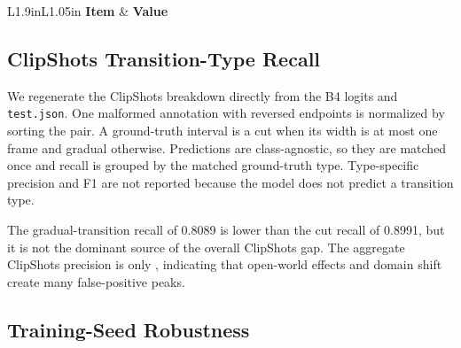 \begin{table}[!t]
\caption{Efficiency and Run-Artifact Statistics}
\label{tab:efficiency}
\centering
\small
\renewcommand{\arraystretch}{1.06}
\begin{tabular}{L{1.9in}L{1.05in}}
\toprule
\textbf{Item} & \textbf{Value} \\
\midrule
\PaperEfficiencyRows
\bottomrule
\end{tabular}
\end{table}

\subsection{ClipShots Transition-Type Recall}

We regenerate the ClipShots breakdown directly from the B4 logits and
\texttt{test.json}. One malformed annotation with reversed endpoints is
normalized by sorting the pair. A ground-truth interval is a cut when its
width is at most one frame and gradual otherwise. Predictions are
class-agnostic, so they are matched once and recall is grouped by the matched
ground-truth type. Type-specific precision and F1 are not reported because the
model does not predict a transition type.

\begin{table}[!t]
\caption{ClipShots Recall by Ground-Truth Transition Type}
\label{tab:clipshots_breakdown}
\centering
\small
\renewcommand{\arraystretch}{1.08}
\end{table}

The gradual-transition recall of 0.8089 is lower than the cut recall of
0.8991, but it is not the dominant source of the overall ClipShots gap.
The aggregate ClipShots precision is only \PaperDeployClipPrecision{},
indicating that open-world effects and domain shift create many
false-positive peaks.

\subsection{Training-Seed Robustness}
\label{sec:seed_robustness}

